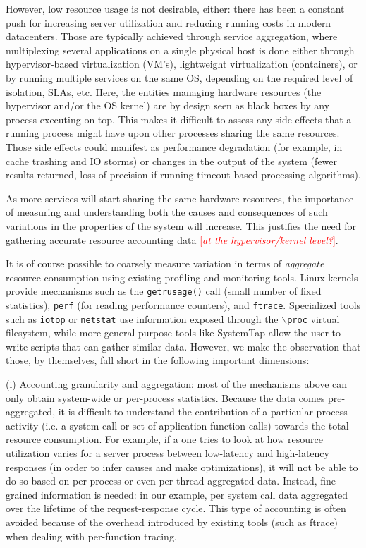 \documentclass[letterpaper,twocolumn,10pt]{article}
\newcommand{\lnote}[1]{\textcolor{red}{[\textit{#1}]}} %
\begin{document}
However, low resource usage is not desirable, either: there has been a constant push for increasing server utilization and reducing running costs in modern datacenters. Those are typically achieved through service aggregation, where multiplexing several applications on a single physical host is done either through hypervisor-based virtualization (VM's), lightweight virtualization (containers), or by running multiple services on the same OS, depending on the required level of isolation, SLAs, etc. 
Here, the entities managing hardware resources (the hypervisor and/or the OS kernel) are by design seen as black boxes by any process executing on top. This makes it difficult to assess any side effects that a running process might have upon other processes sharing the same resources. Those side effects could manifest as performance degradation (for example, in cache trashing and IO storms) or changes in the output of the system (fewer results returned, loss of precision if running timeout-based processing algorithms).

As more services will start sharing the same hardware resources, the importance of measuring and understanding both the causes and consequences of such variations in the properties of the system will increase. This justifies the need for gathering accurate resource accounting data \lnote{at the hypervisor/kernel level?}.

It is of course possible to coarsely measure variation in terms of \textit{aggregate} resource consumption using existing profiling and monitoring tools. Linux kernels provide mechanisms such as the \texttt{getrusage()} call (small number of fixed statistics), \texttt{perf} (for reading performance counters), and \texttt{ftrace}. Specialized tools such as \texttt{iotop} or \texttt{netstat} use information exposed through the \texttt{$\backslash$proc} virtual filesystem, while more general-purpose tools like SystemTap allow the user to write scripts that can gather similar data. However, we make the observation that those, by themselves, fall short in the following important dimensions: 

(i) Accounting granularity and aggregation: most of the mechanisms above can only obtain system-wide or per-process statistics. Because the data comes pre-aggregated, it is difficult to understand the contribution of a particular process activity (i.e. a system call or set of application function calls) towards the total resource consumption. For example, if a one tries to look at how resource utilization varies for a server process between low-latency and high-latency responses (in order to infer causes and make optimizations), it will not be able to do so based on per-process or even per-thread aggregated data. Instead, fine-grained information is needed: in our example, per system call data aggregated over the lifetime of the request-response cycle. This type of accounting is often avoided because of the overhead introduced by existing tools (such as ftrace) when dealing with per-function tracing.
\end{document}
